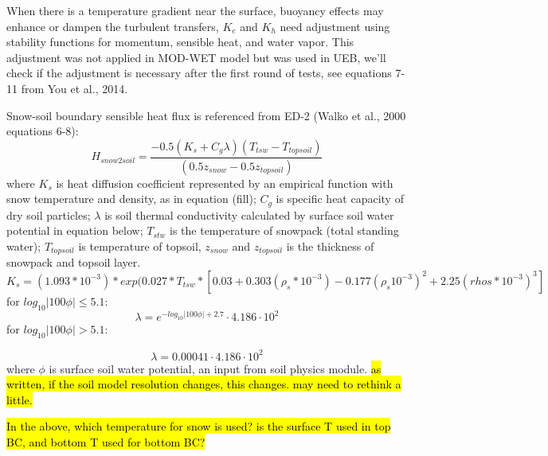 \documentclass{article}
\begin{document}
When there is a temperature gradient near the surface, buoyancy effects may enhance or dampen the turbulent transfers, $K_e$ and $K_h$ need adjustment using stability functions for momentum, sensible heat, and water vapor. This adjustment was not applied in MOD-WET model but was used in UEB, we'll check if the adjustment is necessary after the first round of tests, see equations 7-11 from You et al., 2014.

Snow-soil boundary sensible heat flux is referenced from ED-2 (Walko et al., 2000 equations 6-8):
\begin{equation}
H_{snow2soil}=\frac{-0.5(K_s + C_g \lambda)(T_{tsw}-T_{topsoil} )}{(0.5 z_{snow}- 0.5 z_{topsoil})}
\end{equation}
where $K_s$ is heat diffusion coefficient represented by an empirical function with snow temperature and density, as in equation (fill); $C_g$ is specific heat capacity of dry soil particles; $\lambda$ is soil thermal conductivity calculated by surface soil water potential in equation below; $T_{stw}$ is the temperature of snowpack (total standing water); $T_{topsoil}$ is temperature of topsoil, $z_{snow}$ and $z_{topsoil}$ is the thickness of snowpack and topsoil layer. 
\begin{equation}
K_s= (1.093 * 10^{-3})*exp(0.027*T_{tsw} * [0.03+0.303(\rho_s*10^{-3})-0.177(\rho_s 10^{-3})^2 +2.25(rhos*10^{-3})^3]
\end{equation}
for $log_{10}|100\phi|\leqslant5.1$:
\begin{equation}
\lambda = e^{-log_{10}|100\phi|+2.7} \cdot 4.186 \cdot 10^2
\end{equation}
for $log_{10}|100\phi|>5.1$:

\begin{equation}
\lambda = 0.00041 \cdot 4.186 \cdot 10^2
\end{equation}
where $\phi$ is surface soil water potential, an input from soil physics module.
\hl{as written, if the soil model resolution changes, this changes. may need to rethink a little.}

\hl{In the above, which temperature for snow is used? is the surface T used in top BC, and bottom T used for bottom BC?}
\begin{equation}
\end{equation}
\end{document}
